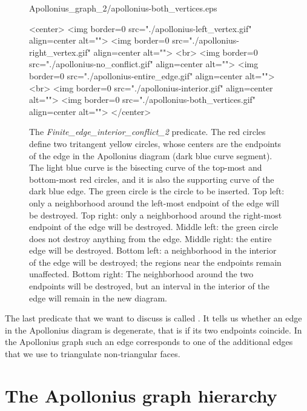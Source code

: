 \begin{figure}[!t]
\begin{ccTexOnly}
\begin{center}
{Apollonius_graph_2/apollonius-both_vertices.eps}\\
\end{center}
\end{ccTexOnly}
\caption{The {\em Finite_edge_interior_conflict_2} predicate. The red
  circles define two tritangent yellow circles, whose centers are
  the endpoints of the edge in the Apollonius diagram (dark blue curve
  segment). The light blue curve is the bisecting curve of the
  top-most and bottom-most red circles, and it is also the supporting
  curve of the dark blue edge. The green circle is the circle to be
  inserted. Top left: only a neighborhood around the left-most
  endpoint of the edge will be destroyed. Top right: only a
  neighborhood around the right-most endpoint of the edge will be
  destroyed. Middle left: the green circle does not destroy anything
  from the edge. Middle right: the entire edge will be
  destroyed. Bottom left: a neighborhood in the interior of the edge
  will be destroyed; the regions near the endpoints remain
  unaffected. Bottom right: The neighborhood around the two endpoints
  will be destroyed, but an interval in the interior of the edge will
  remain in the new diagram.\label{fig-ag2edgeconflict}}
\begin{ccHtmlOnly}
<center>
<img border=0 src="./apollonius-left_vertex.gif" align=center alt="">
<img border=0 src="./apollonius-right_vertex.gif" align=center alt="">
<br>
<img border=0 src="./apollonius-no_conflict.gif" align=center alt="">
<img border=0 src="./apollonius-entire_edge.gif" align=center alt="">
<br>
<img border=0 src="./apollonius-interior.gif" align=center alt="">
<img border=0 src="./apollonius-both_vertices.gif" align=center alt="">
</center>
\end{ccHtmlOnly}
\end{figure}


The last predicate that we want to discuss is called
. It tells us whether an edge in the
Apollonius diagram is degenerate, that is if its two endpoints
coincide. In the Apollonius graph such an edge corresponds to one of
the additional edges that we use to triangulate non-triangular faces.



\section{The Apollonius graph hierarchy}
\label{sec:ag2hierarchy}

